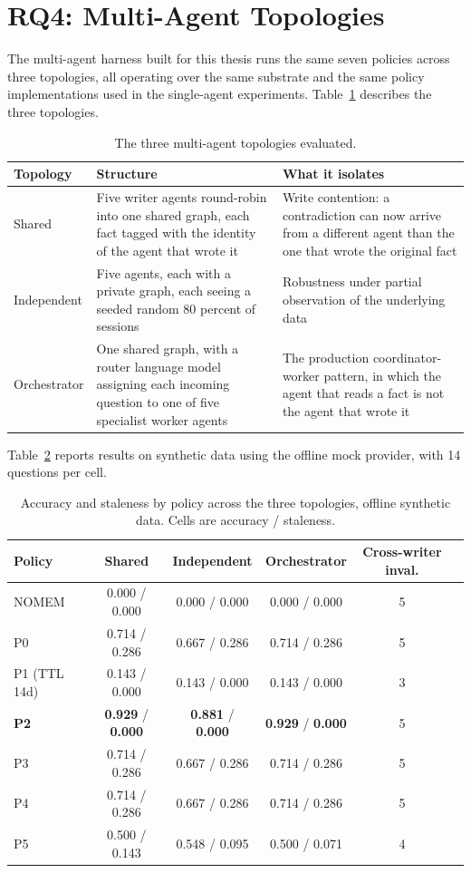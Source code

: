 \section{RQ4: Multi-Agent Topologies}
\label{sec:rq4}

The multi-agent harness built for this thesis runs the same seven policies across three topologies, all operating over the same substrate and the same policy implementations used in the single-agent experiments. Table~\ref{tab:topologies} describes the three topologies.

\begin{table}[H]
\centering
\caption{The three multi-agent topologies evaluated.}
\label{tab:topologies}
\small
\begin{tabular}{lp{5.3cm}p{5.3cm}}
\toprule
Topology & Structure & What it isolates \\
\midrule
Shared & Five writer agents round-robin into one shared graph, each fact tagged with the identity of the agent that wrote it & Write contention: a contradiction can now arrive from a different agent than the one that wrote the original fact \\
Independent & Five agents, each with a private graph, each seeing a seeded random 80 percent of sessions & Robustness under partial observation of the underlying data \\
Orchestrator & One shared graph, with a router language model assigning each incoming question to one of five specialist worker agents & The production coordinator-worker pattern, in which the agent that reads a fact is not the agent that wrote it \\
\bottomrule
\end{tabular}
\end{table}

Table~\ref{tab:swarm-results} reports results on synthetic data using the offline mock provider, with 14 questions per cell.

\begin{table}[H]
\centering
\caption{Accuracy and staleness by policy across the three topologies, offline synthetic data. Cells are accuracy / staleness.}
\label{tab:swarm-results}
\small
\begin{tabular}{lccccc}
\toprule
Policy & Shared & Independent & Orchestrator & Cross-writer inval. \\
\midrule
NOMEM & 0.000 / 0.000 & 0.000 / 0.000 & 0.000 / 0.000 & 5 \\
P0 & 0.714 / 0.286 & 0.667 / 0.286 & 0.714 / 0.286 & 5 \\
P1 (TTL 14d) & 0.143 / 0.000 & 0.143 / 0.000 & 0.143 / 0.000 & 3 \\
\textbf{P2} & \textbf{0.929} / \textbf{0.000} & \textbf{0.881} / \textbf{0.000} & \textbf{0.929} / \textbf{0.000} & 5 \\
P3 & 0.714 / 0.286 & 0.667 / 0.286 & 0.714 / 0.286 & 5 \\
P4 & 0.714 / 0.286 & 0.667 / 0.286 & 0.714 / 0.286 & 5 \\
P5 & 0.500 / 0.143 & 0.548 / 0.095 & 0.500 / 0.071 & 4 \\
\bottomrule
\end{tabular}
\end{table}

